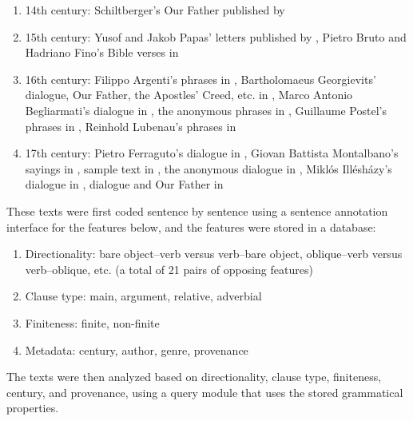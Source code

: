 \documentclass[output=paper,colorlinks,citecolor=brown]{langscibook}
\begin{document}
\begin{enumerate}
    \begin{enumerate}
        \item 14th century: Schiltberger’s Our Father published by \citet{Helmholdt.1966}
        \item 15th century: Yusof and Jakob Papas’ letters published by \citet{Brendemoen.1980}, Pietro Bruto and Hadriano Fino’s Bible verses in \citet{Weil.1953}
        \item 16th century: Filippo Argenti’s phrases in \citet{Adamovic.2001}, Bartholomaeus Georgievits’ dialogue, Our Father, the Apostles’ Creed, etc. in \citet{Heffening.1942}, Marco Antonio Begliarmati’s dialogue in \citet{Teza.1892}, the anonymous phrases in \citet{Adamovic.1976}, Guillaume Postel’s phrases in \citet{Drimba.1966}, Reinhold Lubenau’s phrases in \citet{Adamovic.1977}
        \item 17th century: Pietro Ferraguto’s dialogue in \citet{Bombaci.1940}, Giovan Battista Montalbano’s sayings in \citet{Gallotta.1986}, sample text in \citet{DuRyer.1630}, the anonymous dialogue in \citet{Blau.1868}, Miklós Illésházy’s dialogue in \citet{Nemeth.1970}, dialogue and Our Father in \citet{Herbinius.1675}
    \end{enumerate}
\end{enumerate}

These texts were first coded sentence by sentence using a sentence annotation interface for the features below, and the features were stored in a database:
\begin{enumerate}
    \item Directionality: bare object–verb versus verb–bare object, oblique–verb versus verb–oblique, etc. (a total of 21 pairs of opposing features)
    \item Clause type: main, argument, relative, adverbial
    \item Finiteness: finite, non-finite
    \item Metadata: century, author, genre, provenance
\end{enumerate}

The texts were then analyzed based on directionality, clause type, finiteness, century, and provenance, using a query module that uses the stored grammatical properties. 
\end{document}
